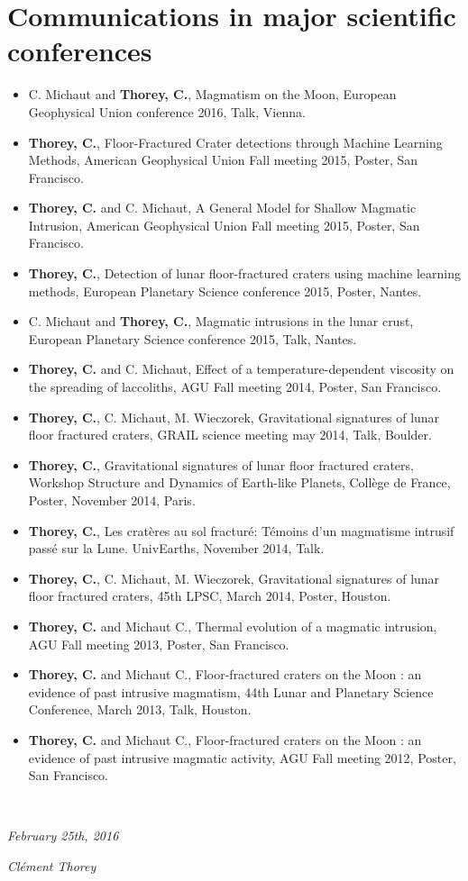 \documentclass[]{friggeri-cv}
\begin{document}
\section{Communications in major scientific conferences}
\begin{itemize}
\item  C. Michaut  and  \textbf{Thorey, C.},  Magmatism  on the  Moon,
  European Geophysical Union conference 2016, Talk, Vienna.
\item \textbf{Thorey,  C.}, Floor-Fractured Crater  detections through
  Machine Learning  Methods, American  Geophysical Union Fall meeting
  2015, Poster, San Francisco.
\item \textbf{Thorey, C.} and C.  Michaut, A General Model for Shallow
  Magmatic Intrusion,  American Geophysical  Union Fall  meeting 2015,
  Poster, San Francisco.
\item \textbf{Thorey, C.}, Detection  of lunar floor-fractured craters
  using   machine  learning   methods,   European  Planetary   Science
  conference 2015, Poster, Nantes.
\item C. Michaut  and \textbf{Thorey, C.}, Magmatic  intrusions in the
  lunar  crust,  European  Planetary Science  conference  2015,  Talk,
  Nantes.
\item \textbf{Thorey,  C.} and  C. Michaut,  Effect of  a temperature-dependent
  viscosity on  the spreading  of laccoliths,  AGU Fall  meeting 2014,
  Poster, San Francisco.
\item \textbf{Thorey,  C.}, C.  Michaut, M.  Wieczorek, Gravitational signatures
  of lunar  floor fractured craters,  GRAIL science meeting  may 2014,
  Talk, Boulder.
\item  \textbf{Thorey, C.},  Gravitational signatures  of lunar  floor
  fractured  craters, Workshop  Structure and  Dynamics of  Earth-like
  Planets, Collège de France, Poster, November 2014, Paris.
\item \textbf{Thorey,  C.}, Les cratères au sol fracturé: Témoins
  d'un magmatisme  intrusif passé  sur la Lune.   UnivEarths, November
  2014, Talk.
\item \textbf{Thorey,  C.}, C.  Michaut, M.   Wieczorek, Gravitational
  signatures of lunar floor fractured  craters, 45th LPSC, March 2014,
  Poster, Houston.
\item  \textbf{Thorey,  C.}   and Michaut  C.,  Thermal evolution  of a  magmatic
  intrusion, AGU Fall meeting 2013, Poster, San Francisco.
\item \textbf{Thorey,  C.} and Michaut C.,  Floor-fractured craters on the Moon :
  an evidence  of past intrusive  magmatism, 44th Lunar  and Planetary
  Science Conference, March 2013, Talk, Houston.
\item \textbf{Thorey,  C.} and Michaut C.,  Floor-fractured craters on the Moon :
  an evidence  of past intrusive  magmatic activity, AGU  Fall meeting
  2012, Poster, San Francisco.
\end{itemize}
~
~

\begin{flushleft}
\emph{February 25th, 2016}
\end{flushleft}
\begin{flushright}
\emph{Clément Thorey}
\end{flushright}
\end{document}
